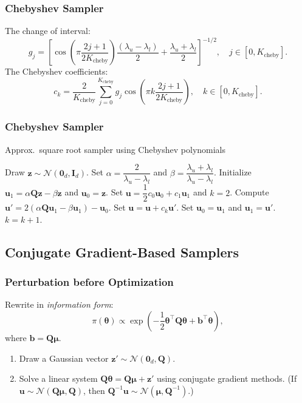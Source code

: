 \documentclass[aspectratio=169]{beamer}
\newcommand{\B}[1]{\mathbf{#1}} %
\newcommand{\Bs}[1]{\boldsymbol{#1}} %
\newcommand{\pr}[1]{\left(#1\right)} %
\newcommand{\br}[1]{\left[#1\right]} %
\begin{document}
\begin{frame}
\frametitle{Chebyshev Sampler}
The change of interval:
\[g_j = \br{\cos\pr{\pi\frac{2j+1}{2K_{\text{cheby}}}}\dfrac{(\lambda_u-\lambda_l)}{2} + \dfrac{\lambda_u+\lambda_l}{2}}^{-1/2}, \quad j \in [0,K_{\text{cheby}}].\]
The Chebyshev coefficients:
\[c_k = \dfrac{2}{K_{\text{cheby}}} \displaystyle \sum_{j=0}^{K_{\text{cheby}}} g_j \cos\pr{\pi k\frac{2j+1}{2K_{\text{cheby}}}}, \quad k \in [0,K_{\text{cheby}}]. \]
\end{frame}

\begin{frame}
\frametitle{Chebyshev Sampler}
\begin{algorithm}[H]
\caption{Approx.\ square root sampler using Chebyshev polynomials}
\begin{algorithmic}[1] 
\State Draw $\B{z} \sim \mathcal{N}(\B{0}_d,\B{I}_d)$.
\State Set $\alpha = \dfrac{2}{\lambda_u-\lambda_l}$ and $\beta = \dfrac{\lambda_u+\lambda_l}{\lambda_u-\lambda_l}$.
\State Initialize $\B{u}_1 = \alpha\B{Q z} - \beta\B{z}$ and $\B{u}_0 = \B{z}$. 
\State Set $\B{u} = \dfrac{1}{2}c_0\B{u}_0 + c_1\B{u}_1$ and $k=2$.
 
\State Compute $\B{u}' = 2(\alpha\B{Q}\B{u}_1 - \beta\B{u}_1) - \B{u}_0$.
\State Set $\B{u} = \B{u} + c_k\B{u}'$.
\State Set $\B{u}_0 = \B{u}_1$ and $\B{u}_1 = \B{u}'$.
\State $k = k + 1$.
\EndWhile    
\end{algorithmic}
\end{algorithm}
\end{frame}

\subsection{Conjugate Gradient-Based Samplers}
\begin{frame}
\frametitle{Perturbation before Optimization}
Rewrite in \textit{information form}:
\[
  \pi(\Bs{\theta}) \propto \exp\pr{-\dfrac{1}{2}\Bs{\theta}^{\top}\B{Q}\Bs{\theta} + \B{b}^{\top}\Bs{\theta}},
\]
where $\B{b} = \B{Q}\Bs{\mu}$.
\begin{enumerate}
    \item Draw a Gaussian vector $\B{z}' \sim \mathcal{N}(\B{0}_d,\B{Q})$.
    \item Solve a linear system \(\B{Q}\Bs{\theta} = \B{Q}\Bs{\mu} + \B{z}'\) using conjugate gradient methods. (If $\B{u} \sim \mathcal{N}(\B{Q}\Bs{\mu},\B{Q})$, then $\B{Q}^{-1}\B{u} \sim \mathcal{N}(\Bs{\mu},\B{Q}^{-1})$.)
\end{enumerate}
\end{frame}
\end{document}
